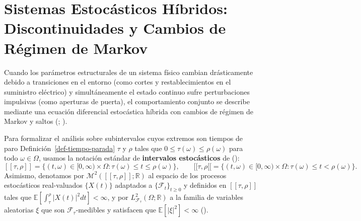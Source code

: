 \documentclass[
  spanish,
  us-letterpaper,
]{scrreprt}
\numberwithin{equation}{section}
\theoremstyle{plain}
\theoremstyle{plain}
\theoremstyle{plain}
\theoremstyle{definition}
\theoremstyle{remark}
\begin{document}
\section{Sistemas Estocásticos Híbridos: Discontinuidades y Cambios de
Régimen de
Markov}\label{sistemas-estocuxe1sticos-huxedbridos-discontinuidades-y-cambios-de-ruxe9gimen-de-markov}

Cuando los parámetros estructurales de un sistema físico cambian
drásticamente debido a transiciones en el entorno (como cortes y
restablecimientos en el suministro eléctrico) y simultáneamente el
estado continuo sufre perturbaciones impulsivas (como aperturas de
puerta), el comportamiento conjunto se describe mediante una ecuación
diferencial estocástica híbrida con cambios de régimen de Markov y
saltos (;
).

Para formalizar el análisis sobre subintervalos cuyos extremos son
tiempos de paro Definición~\ref{def-tiempo-parada} \(\tau\) y \(\rho\)
tales que \(0 \le \tau(\omega) \le \rho(\omega)\) para todo
\(\omega \in \Omega\), usamos la notación estándar de \textbf{intervalos
estocásticos} de (): \[
[[\tau, \rho]] = \{(t, \omega) \in [0, \infty) \times \Omega : \tau(\omega) \le t \le \rho(\omega)\}, \qquad [[\tau, \rho[[ = \{(t, \omega) \in [0, \infty) \times \Omega : \tau(\omega) \le t < \rho(\omega)\}.
\] Asimismo, denotamos por \(\mathcal{M}^2([[\tau, \rho]]; \mathbb{R})\)
al espacio de los procesos estocásticos real-valuados \(\{X(t)\}\)
adaptados a \(\{\mathcal{F}_t\}_{t \ge 0}\) y definidos en
\([[\tau, \rho]]\) tales que
\(\mathbb{E}\left[ \displaystyle \int_\tau^\rho \vert X(t) \vert^2 dt\right] < \infty\),
y por \(L^2_{\mathcal{F}_\tau}(\Omega; \mathbb{R})\) a la familia de
variables aleatorias \(\xi\) que son \(\mathcal{F}_\tau\)-medibles y
satisfacen que \(\mathbb{E}[\vert \xi \vert^2] < \infty\)
().
\end{document}
